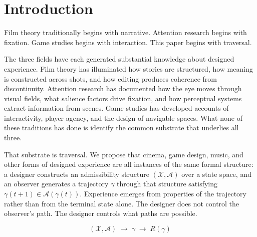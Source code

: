 \documentclass[12pt, a4paper]{article}
\theoremstyle{plain}
\theoremstyle{definition}
\theoremstyle{remark}
\newcommand{\X}{\mathcal{X}}
\newcommand{\A}{\mathcal{A}}
\newcommand{\traj}{\gamma}
\newcommand{\reward}{R}
\begin{document}
\tableofcontents
\newpage

\section{Introduction}
\label{sec:intro}

Film theory traditionally begins with narrative. Attention
research begins with fixation. Game studies begins with
interaction. This paper begins with traversal.

The three fields have each generated substantial knowledge
about designed experience. Film theory has illuminated how
stories are structured, how meaning is constructed across
shots, and how editing produces coherence from discontinuity.
Attention research has documented how the eye moves through
visual fields, what salience factors drive fixation, and how
perceptual systems extract information from scenes. Game
studies has developed accounts of interactivity, player
agency, and the design of navigable spaces. What none of
these traditions has done is identify the common substrate
that underlies all three.

That substrate is traversal. We propose that cinema, game
design, music, and other forms of designed experience are
all instances of the same formal structure: a designer
constructs an admissibility structure $(\X, \A)$ over a
state space, and an observer generates a trajectory $\traj$
through that structure satisfying $\traj(t+1) \in
\A(\traj(t))$. Experience emerges from properties of the
trajectory rather than from the terminal state alone. The
designer does not control the observer's path. The designer
controls what paths are possible.

\begin{equation}
  (\X, \A) \;\longrightarrow\; \traj
  \;\longrightarrow\; \reward(\traj)
  \label{eq:traversal_diagram}
\end{equation}
\end{document}
